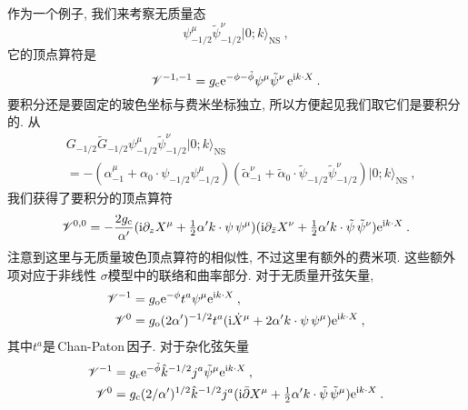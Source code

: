 作为一个例子, 我们来考察无质量态
\begin{equation}
    \psi_{-1/2}^{\mu}\tilde{\psi}_{-1/2}^{\nu} \lvert 0;k\rangle_{\text{NS}} \:, \label{12.3.41}
\end{equation}
它的顶点算符是
\begin{equation}
    \mathscr{V}^{-1,-1} = g_{\mathrm{c}}\mathrm{e}^{-\phi-\tilde{\phi}}\psi^{\mu}\tilde{\psi}^{\nu}\,\mathrm{e}^{\mathrm{i} k\cdot X}\:. \label{12.3.42}
\end{equation}
要积分还是要固定的玻色坐标与费米坐标独立, 所以方便起见我们取它们是要积分的. 从
\begin{align}
    & G_{-1/2}\tilde{G}_{-1/2}\psi_{-1/2}^{\mu}\tilde{\psi}_{-1/2}^{\nu}\lvert 0;k\rangle_{\text{NS}} \nonumber\\
    &=-(\alpha_{-1}^{\mu}+\alpha_{0}\cdot \psi_{-1/2}\psi_{-1/2}^{\mu})
    (\tilde{\alpha}^{\nu}_{-1}+\tilde{\alpha}_{0}\cdot \tilde{\psi}_{-1/2}\tilde{\psi}_{-1/2}^{\nu})\lvert 0;k\rangle_{\text{NS}} \:, \label{12.3.43}
\end{align}
我们获得了要积分的顶点算符
\begin{equation}
    \mathscr{V}^{0,0} = -\frac{2g_{\mathrm{c}}}{\alpha^{\prime}}(\mathrm{i}\partial_{z}X^{\mu}+
    \tfrac{1}{2}\alpha^{\prime}k\cdot \psi\,\psi^{\mu})(\mathrm{i}\partial_{\bar{z}}X^{\nu}
    +\tfrac{1}{2}\alpha^{\prime}k\cdot\tilde{\psi}\,\tilde{\psi}^{\nu}) \mathrm{e}^{\mathrm{i} k\cdot X} \:. \label{12.3.44}
\end{equation}
注意到这里与无质量玻色顶点算符的相似性, 不过这里有额外的费米项. 这些额外项对应于非线性 $\sigma $模型中的联络和曲率部分. 对于无质量开弦矢量,
\begin{subequations}
\begin{align}
    \mathscr{V}^{-1} &= g_{\mathrm{o}}\mathrm{e}^{-\phi}t^{a}\psi^{\mu}\mathrm{e}^{\mathrm{i} k\cdot X} \:, \label{12.3.45a} \\
    \mathscr{V}^{0} &= g_{\mathrm{o}}(2\alpha^{\prime})^{-1/2}t^{a}(\mathrm{i} \dot{X}^{\mu}
    +2\alpha^{\prime}k\cdot\psi\,\psi^{\mu})\mathrm{e}^{\mathrm{i} k\cdot X} \:, \label{12.3.45b}
\end{align} \label{12.3.45}
\end{subequations}
其中$ t^{a} $是\,Chan-Paton\,因子. 对于杂化弦矢量
\begin{subequations}
\begin{align}
    \mathscr{V}^{-1} &= g_{\mathrm{c}}\mathrm{e}^{-\tilde{\phi}}\hat{k}^{-1/2}j^{a}\tilde{\psi}^{\mu}\mathrm{e}^{\mathrm{i} k\cdot X} \:, \label{12.3.46a}\\
    \mathscr{V}^{0} &= g_{\mathrm{c}}(2/\alpha^{\prime})^{1/2}\hat{k}^{-1/2}j^{a}
    (\mathrm{i}\bar{\partial}X^{\mu}+\tfrac{1}{2}\alpha^{\prime}k\cdot \tilde{\psi}\,\tilde{\psi}^{\mu})\mathrm{e}^{\mathrm{i} k\cdot X}\:.
    \label{12.3.46b}
\end{align} \label{12.3.46}
\end{subequations}
